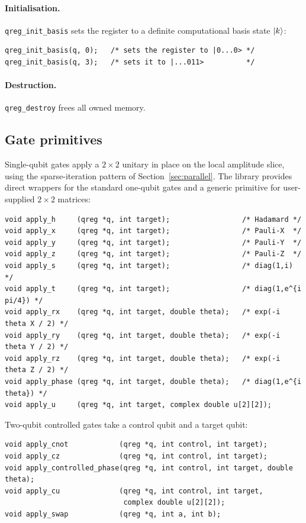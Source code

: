\paragraph{Initialisation.} \verb|qreg_init_basis| sets the register to a definite computational basis state $\mathinner{|{k}\rangle}$:
\begin{lstlisting}
qreg_init_basis(q, 0);   /* sets the register to |0...0> */
qreg_init_basis(q, 3);   /* sets it to |...011>          */
\end{lstlisting}

\paragraph{Destruction.} \verb|qreg_destroy| frees all owned memory.

\subsection{Gate primitives}

Single-qubit gates apply a $2\times 2$ unitary in place on the local amplitude slice, using the sparse-iteration pattern of Section~\ref{sec:parallel}. The library provides direct wrappers for the standard one-qubit gates and a generic primitive for user-supplied $2\times 2$ matrices:

\begin{lstlisting}
void apply_h     (qreg *q, int target);                 /* Hadamard */
void apply_x     (qreg *q, int target);                 /* Pauli-X  */
void apply_y     (qreg *q, int target);                 /* Pauli-Y  */
void apply_z     (qreg *q, int target);                 /* Pauli-Z  */
void apply_s     (qreg *q, int target);                 /* diag(1,i) */
void apply_t     (qreg *q, int target);                 /* diag(1,e^{i pi/4}) */
void apply_rx    (qreg *q, int target, double theta);   /* exp(-i theta X / 2) */
void apply_ry    (qreg *q, int target, double theta);   /* exp(-i theta Y / 2) */
void apply_rz    (qreg *q, int target, double theta);   /* exp(-i theta Z / 2) */
void apply_phase (qreg *q, int target, double theta);   /* diag(1,e^{i theta}) */
void apply_u     (qreg *q, int target, complex double u[2][2]);
\end{lstlisting}

Two-qubit controlled gates take a control qubit and a target qubit:
\begin{lstlisting}
void apply_cnot            (qreg *q, int control, int target);
void apply_cz              (qreg *q, int control, int target);
void apply_controlled_phase(qreg *q, int control, int target, double theta);
void apply_cu              (qreg *q, int control, int target,
                            complex double u[2][2]);
void apply_swap            (qreg *q, int a, int b);
\end{lstlisting}

